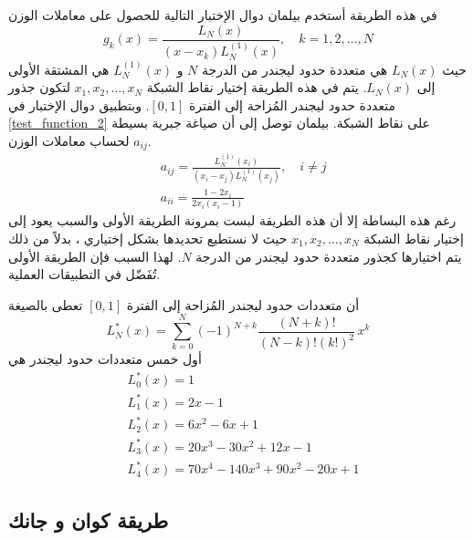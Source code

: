 في هذه الطريقة أستخدم بيلمان دوال الإختبار التالية للحصول على معاملات الوزن
\begin{equation}
	\label{test_function_2}
	g_k(x)=\frac{L_N(x)}{(x-x_k)L_N^{(1)}(x)},\quad k=1,2,\dots,N
\end{equation}
حيث $L_N(x)$ هي متعددة حدود ليجندر من الدرجة $N$ و $L_N^{(1)}(x)$ هي المشتقة الأولى إلى $L_N(x)$. يتم في هذه الطريقة إختيار نقاط الشبكة $x_1,x_2,\dots,x_N$ لتكون جذور متعددة حدود ليجندر المُزاحة إلى الفترة $[0,1]$. وبتطبيق دوال الإختبار في \eqref{test_function_2} على نقاط الشبكة. بيلمان توصل إلى أن صياغة جبرية بسيطة لحساب معاملات الوزن $a_{ij}$.
\begin{equation}
	\label{bilman2_equations}
	\begin{aligned}
		&a_{ij}=\frac{L_N^{(1)}(x_i)}{(x_i-x_j)L_N^{(1)}(x_j)},\quad i\neq j\\[10pt]
		& a_{ii}=\frac{1-2x_i}{2x_i(x_i-1)}   
	\end{aligned}
\end{equation}
رغم هذه البساطة إلا أن هذه الطريقة لبست بمرونة الطريقة الأولى والسبب يعود إلى إختيار نقاط الشبكة $x_1,x_2,\dots,x_N$ حيث لا نستطيع تحديدها بشكل إختياري ، بدلاً من ذلك يتم اختيارها كجذور متعددة حدود ليجندر من الدرجة $N$. لهذا السبب فإن الطريقة الأولى تُفَضّل في التطبيقات العملية.

\begin{note}
	أن متعددات حدود ليجندر المُزاحة إلى الفترة $[0,1]$ تعطى بالصيغة 
	\begin{equation*}
		L_N^{*}(x)=\sum_{k=0}^{N}(-1)^{N+k}\frac{(N+k)!}{(N-k)!(k!)^2}\,x^k
	\end{equation*}
	أول خمس متعددات حدود ليجندر هي
	\begin{align*}
		&L_0^{*}(x)=1\\
		&L_1^{*}(x)=2x-1\\
		&L_2^{*}(x)=6x^2-6x+1\\
		&L_3^{*}(x)=20x^3-30x^2+12x-1\\
		&L_4^{*}(x)=70x^4-140x^3+90x^2-20x+1
	\end{align*}
\end{note}

\subsection[طريقة كوان و جانك]{طريقة كوان و جانك \cite{Quan} }

